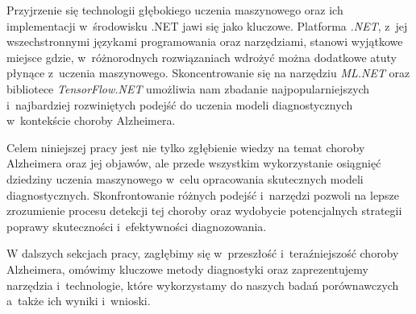 Przyjrzenie się technologii głębokiego uczenia maszynowego oraz ich implementacji w~środowisku .NET jawi się jako kluczowe.
Platforma \emph{.NET}, z~jej wszechstronnymi językami programowania oraz narzędziami, stanowi wyjątkowe miejsce gdzie, w~różnorodnych rozwiązaniach wdrożyć można dodatkowe atuty płynące z~uczenia maszynowego.
Skoncentrowanie się na narzędziu \emph{ML.NET} oraz bibliotece \emph{TensorFlow.NET} umożliwia nam zbadanie najpopularniejszych i~najbardziej rozwiniętych podejść do uczenia modeli diagnostycznych w~kontekście choroby Alzheimera.

Celem niniejszej pracy jest nie tylko zgłębienie wiedzy na temat choroby Alzheimera oraz jej objawów, ale przede wszystkim wykorzystanie osiągnięć dziedziny uczenia maszynowego w~celu opracowania skutecznych modeli diagnostycznych.
Skonfrontowanie różnych podejść i~narzędzi pozwoli na lepsze zrozumienie procesu detekcji tej choroby oraz wydobycie potencjalnych strategii poprawy skuteczności i~efektywności diagnozowania.

W dalszych sekcjach pracy, zagłębimy się w~przeszłość i~teraźniejszość choroby Alzheimera, omówimy kluczowe metody diagnostyki oraz zaprezentujemy narzędzia i~technologie, które wykorzystamy do naszych badań porównawczych a~także ich wyniki i~wnioski.
